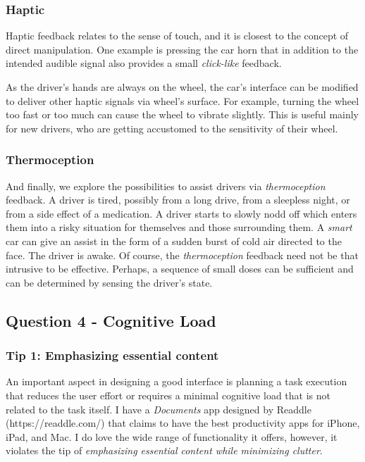 \documentclass[12pt,letterpaper]{article}
\begin{document}
\subsubsection*{Haptic}
Haptic feedback relates to the sense of touch, and it is closest to the concept of direct manipulation. One example is pressing the car horn that in addition to the intended audible signal also provides a small \textit{click-like} feedback. 

As the driver's hands are always on the wheel, the car's interface can be modified to deliver other haptic signals via wheel's surface. For example, turning the wheel too fast or too much can cause the wheel to vibrate slightly. This is useful mainly for new drivers, who are getting accustomed to the sensitivity of their wheel.

\subsubsection*{Thermoception}
And finally, we explore the possibilities to assist drivers via \textit{thermoception} feedback. A driver is tired, possibly from a long drive, from a sleepless night, or from a side effect of a medication. A driver starts to slowly nodd off which enters them into a risky situation for themselves and those surrounding them. A \textit{smart} car can give an assist in the form of a sudden burst of cold air directed to the face. The driver is awake. Of course, the \textit{thermoception} feedback need not be that intrusive to be effective. Perhaps, a sequence of small doses can be sufficient and can be determined by sensing the driver's state. 

\subsection*{Question 4 - Cognitive Load}

\subsubsection*{Tip 1: Emphasizing essential content}
An important aspect in designing a good interface is planning a task execution that reduces the user effort or requires a minimal cognitive load that is not related to the task itself. I have a \textit{Documents} app designed by Readdle (https://readdle.com/) that claims to have the best productivity apps for iPhone, iPad, and Mac. I do love the wide range of functionality it offers, however, it violates the tip of \textit{emphasizing essential content while minimizing clutter}. 
\end{document}
